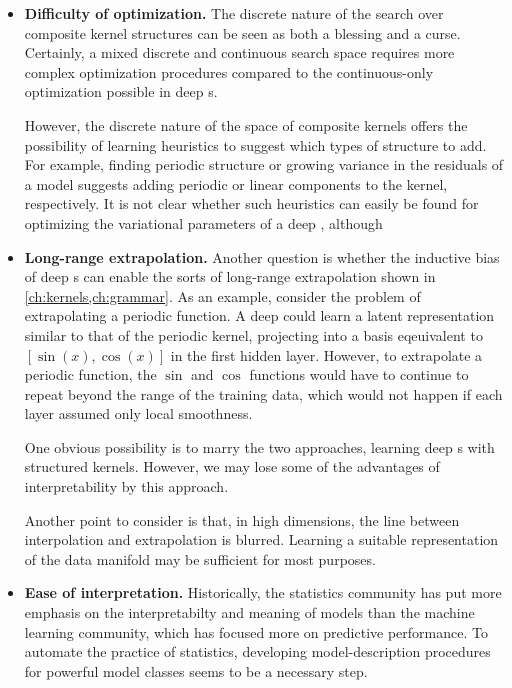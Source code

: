 \begin{itemize}

\item {\bf Difficulty of optimization.}
The discrete nature of the search over composite kernel structures can be seen as both a blessing and a curse.
Certainly, a mixed discrete and continuous search space requires more complex optimization procedures compared to the continuous-only optimization possible in deep \gp{}s.

However, the discrete nature of the space of composite kernels offers the possibility of learning heuristics to suggest which types of structure to add.
For example, finding periodic structure or growing variance in the residuals of a model suggests adding periodic or linear components to the kernel, respectively.
It is not clear whether such heuristics can easily be found for optimizing the variational parameters of a deep \gp{}, although

\item {\bf Long-range extrapolation.}
Another question is whether the inductive bias of deep \gp{}s can enable the sorts of long-range extrapolation shown in \cref{ch:kernels,ch:grammar}.
As an example, consider the problem of extrapolating a periodic function.
A deep \gp{} could learn a latent representation similar to that of the periodic kernel, projecting into a basis eqeuivalent to $[\sin(x), \cos(x)]$ in the first hidden layer.
However, to extrapolate a periodic function, the $\sin$ and $\cos$ functions would have to continue to repeat beyond the range of the training data, which would not happen if each layer assumed only local smoothness.

One obvious possibility is to marry the two approaches, learning deep \gp{}s with structured kernels.
However, we may lose some of the advantages of interpretability by this approach.

Another point to consider is that, in high dimensions, the line between interpolation and extrapolation is blurred.
Learning a suitable representation of the data manifold may be sufficient for most purposes.

\item {\bf Ease of interpretation.}
Historically, the statistics community has put more emphasis on the interpretabilty and meaning of models than the machine learning community, which has focused more on predictive performance.
To automate the practice of statistics, developing model-description procedures for powerful model classes seems to be a necessary step. %


\end{itemize}
